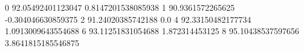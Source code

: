 0 92.05492401123047 0.8147201538085938
1 90.9361572265625 -0.304046630859375
2 91.24020385742188 0.0
4 92.33150482177734 1.0913009643554688
6 93.11251831054688 1.872314453125
8 95.10438537597656 3.8641815185546875
